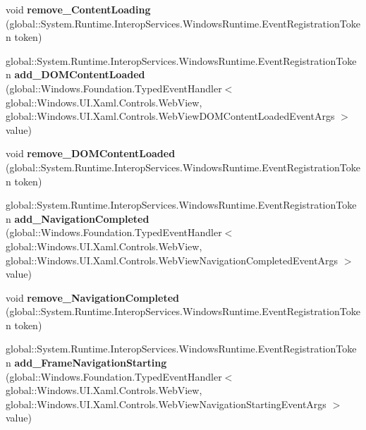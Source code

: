 \begin{DoxyCompactItemize}
void {\bfseries remove\+\_\+\+Content\+Loading} (global\+::\+System.\+Runtime.\+Interop\+Services.\+Windows\+Runtime.\+Event\+Registration\+Token token)
\item 
\mbox{\label{class_windows_1_1_u_i_1_1_xaml_1_1_controls_1_1_web_view_a5d6440eae6015ec132e5aa0d3b751b5f}} 
global\+::\+System.\+Runtime.\+Interop\+Services.\+Windows\+Runtime.\+Event\+Registration\+Token {\bfseries add\+\_\+\+D\+O\+M\+Content\+Loaded} (global\+::\+Windows.\+Foundation.\+Typed\+Event\+Handler$<$ global\+::\+Windows.\+U\+I.\+Xaml.\+Controls.\+Web\+View, global\+::\+Windows.\+U\+I.\+Xaml.\+Controls.\+Web\+View\+D\+O\+M\+Content\+Loaded\+Event\+Args $>$ value)
\item 
\mbox{\label{class_windows_1_1_u_i_1_1_xaml_1_1_controls_1_1_web_view_a596a722f4d6a0b2c3a141febd26a7e0c}} 
void {\bfseries remove\+\_\+\+D\+O\+M\+Content\+Loaded} (global\+::\+System.\+Runtime.\+Interop\+Services.\+Windows\+Runtime.\+Event\+Registration\+Token token)
\item 
\mbox{\label{class_windows_1_1_u_i_1_1_xaml_1_1_controls_1_1_web_view_a59c21d9d632dd5968f5ea16c8da3ab20}} 
global\+::\+System.\+Runtime.\+Interop\+Services.\+Windows\+Runtime.\+Event\+Registration\+Token {\bfseries add\+\_\+\+Navigation\+Completed} (global\+::\+Windows.\+Foundation.\+Typed\+Event\+Handler$<$ global\+::\+Windows.\+U\+I.\+Xaml.\+Controls.\+Web\+View, global\+::\+Windows.\+U\+I.\+Xaml.\+Controls.\+Web\+View\+Navigation\+Completed\+Event\+Args $>$ value)
\item 
\mbox{\label{class_windows_1_1_u_i_1_1_xaml_1_1_controls_1_1_web_view_a17436d2219b831aeaac455abd0126294}} 
void {\bfseries remove\+\_\+\+Navigation\+Completed} (global\+::\+System.\+Runtime.\+Interop\+Services.\+Windows\+Runtime.\+Event\+Registration\+Token token)
\item 
\mbox{\label{class_windows_1_1_u_i_1_1_xaml_1_1_controls_1_1_web_view_addb2e6ae0e6b5b9acd50a349f6206712}} 
global\+::\+System.\+Runtime.\+Interop\+Services.\+Windows\+Runtime.\+Event\+Registration\+Token {\bfseries add\+\_\+\+Frame\+Navigation\+Starting} (global\+::\+Windows.\+Foundation.\+Typed\+Event\+Handler$<$ global\+::\+Windows.\+U\+I.\+Xaml.\+Controls.\+Web\+View, global\+::\+Windows.\+U\+I.\+Xaml.\+Controls.\+Web\+View\+Navigation\+Starting\+Event\+Args $>$ value)

\end{DoxyCompactItemize}
